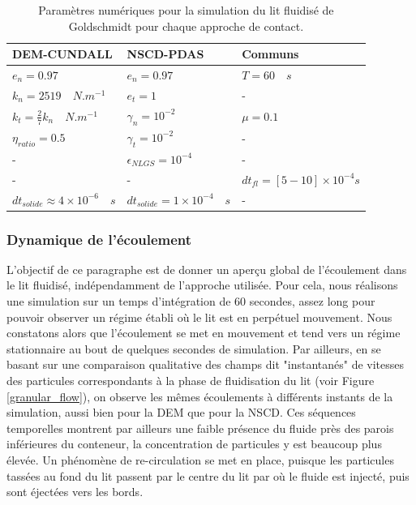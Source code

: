 \vspace{-0.8cm}

\begin{center}
\begin{table}[!h]
\begin{tabular}{ |p{4.4cm}|p{4.2cm}|p{3.8cm}| }
 \hline \rowcolor{lightgray}
 DEM-CUNDALL& NSCD-PDAS& Communs\\
 \hline
 $e_n = 0.97$ & $e_n = 0.97$ & $T = 60 \quad s$\\
 $k_n = 2519 \quad N.m^{-1}$& $e_t = 1$ & -\\
 $k_t = \frac{2}{7} k_n \quad N.m^{-1}$ & $\gamma_n = 10^{-2}$ & $\mu = 0.1$\\
 $\eta_{ratio} = 0.5$ & $\gamma_t = 10^{-2}$ & -\\
 - & $\epsilon_{NLGS} =  10^{-4}$ & -\\
 - &- &$dt_{fl} = [5-10]\times10^{-4} s$\\
 $dt_{solide} \approx 4\times10^{-6} \quad s$ &$dt_{solide} = 1\times10^{-4} \quad s$ &-\\
 \hline
\end{tabular}
\caption{Paramètres numériques pour la simulation du lit fluidisé de Goldschmidt \cite{goldschmidt2004hydrodynamic} pour chaque approche de contact.}\label{tab_fluide_num}
\end{table}
\end{center}

\subsubsection{Dynamique de l'écoulement}

L'objectif de ce paragraphe est de donner un aperçu global de l'écoulement dans le lit fluidisé, indépendamment de l'approche utilisée. Pour cela, nous réalisons une simulation sur un temps d'intégration de $60$ secondes, assez long pour pouvoir observer un régime établi où le lit est en perpétuel mouvement. Nous constatons alors que l'écoulement se met en mouvement et tend vers un régime stationnaire au bout de quelques secondes de simulation. Par ailleurs, en se basant sur une comparaison qualitative des champs dit "instantanés" de vitesses des particules correspondants à la phase de fluidisation du lit (voir Figure \ref{granular_flow}), on observe les mêmes écoulements à différents instants de la simulation, aussi bien pour la DEM que pour la NSCD. Ces séquences temporelles montrent par ailleurs une faible présence du fluide près des parois inférieures du conteneur, la concentration de particules y est beaucoup plus élevée. Un phénomène de re-circulation se met en place, puisque les particules tassées au fond du lit passent par le centre du lit par où le fluide est injecté, puis sont éjectées vers les bords.

